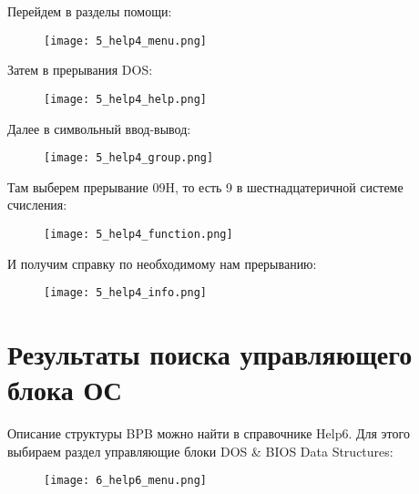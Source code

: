 Перейдем в разделы помощи:
\begin{figure}[H]
  \begin{center}
    \texttt{[image: 5\_help4\_menu.png]}
    \caption{}
    \label{pic:pic_name}
  \end{center}
\end{figure}

Затем в прерывания DOS:
\begin{figure}[H]
  \begin{center}
    \texttt{[image: 5\_help4\_help.png]}
    \caption{}
    \label{pic:pic_name}
  \end{center}
\end{figure}

Далее в символьный ввод-вывод:
\begin{figure}[H]
  \begin{center}
    \texttt{[image: 5\_help4\_group.png]}
    \caption{}
    \label{pic:pic_name}
  \end{center}
\end{figure}

Там выберем прерывание 09H, то есть 9 в шестнадцатеричной системе счисления:
\begin{figure}[H]
  \begin{center}
    \texttt{[image: 5\_help4\_function.png]}
    \caption{}
    \label{pic:pic_name}
  \end{center}
\end{figure}

И получим справку по необходимому нам прерыванию:
\begin{figure}[H]
  \begin{center}
    \texttt{[image: 5\_help4\_info.png]}
    \caption{}
    \label{pic:pic_name}
  \end{center}
\end{figure}

\section{Результаты поиска управляющего блока ОС}

Описание структуры BPB можно найти в справочнике Help6.
Для этого выбираем раздел управляющие блоки DOS \& BIOS Data Structures:
\begin{figure}[H]
  \begin{center}
    \texttt{[image: 6\_help6\_menu.png]}
    \caption{}
    \label{pic:pic_name}
  \end{center}
\end{figure}

